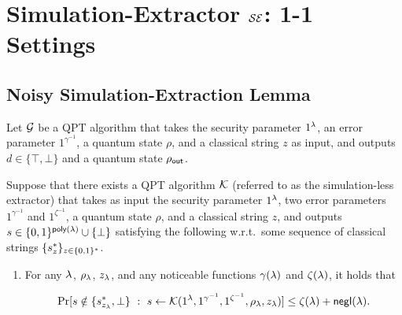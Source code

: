 \section{Simulation-Extractor \textnormal{$\mathcal{SE}$}: 1-1 Settings}
\label{sec:simext:1-1}

\subsection{Noisy Simulation-Extraction Lemma}
\label{sec:noisy-sim-ext}

\begin{lemma}
\label{lem:Noisy-SimExt}
Let $\mathcal{G}$ be a QPT algorithm that takes the security parameter $1^\lambda$, an error parameter $1^{\gamma^{-1}}$, a quantum state $\rho$, {and a classical string $z$} as input,  and outputs  $d\in \{\top,\bot\}$ and a quantum state $\rho_{\mathsf{out}}$. 

Suppose that there exists a QPT algorithm $\mathcal{K}$ (referred to as the simulation-less extractor) that takes as input the security parameter $1^\lambda$, two error parameters $1^{\gamma^{-1}}$ and $1^{\zeta^{-1}}$, a quantum state $\rho$, {and a classical string $z$}, and outputs $s\in \{0,1\}^{\mathsf{poly}(\lambda)}\cup \{\bot\}$   
satisfying the following w.r.t.\ some sequence of classical strings {$\{s^*_{z}\}_{z\in \{0,1\}^*}$.}

\begin{enumerate}
 \item  \label{item:s_star_or_bot}
    For any $\lambda$,  $\rho_\lambda$,  $z_\lambda$, and any noticeable functions $\gamma(\lambda)$ and $\zeta(\lambda)$, it holds that  

$$\Pr[s \notin \{s^*_{z_\lambda}, \bot\}~:~s \leftarrow \mathcal{K}(1^\lambda,1^{\gamma^{-1}}, 1^{\zeta^{-1}}, \rho_\lambda,{z_\lambda})]\le \zeta(\lambda) +\mathsf{negl}(\lambda).$$



\end{enumerate}
\end{lemma}
